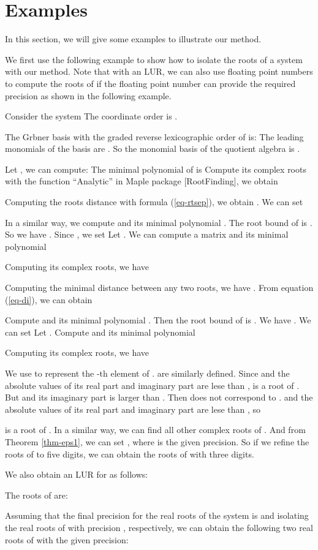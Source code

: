 \documentclass[amsthm]{JSC_LaTex_2007_Mar_12/elsart}
\def\bref#1{(\ref{#1})}
\begin{document}
\section{Examples}
In this section, we will give some examples to illustrate our
method.

We first use the following  example to show how to isolate the roots
of a system with our method. Note that with an LUR, we can also use
floating point numbers to compute the roots of  if the
floating point number can provide the required precision as shown in
the following example.

\begin{exmp} Consider the system
 The coordinate order is .

The Grbner basis  with the graded reverse
lexicographic order  of  is: {\small
} The leading monomials of the
basis are . So the monomial basis of the
quotient algebra  is .

Let , we can compute:
 The minimal polynomial of
 is  Compute its
complex roots with the function ``Analytic'' in Maple package
[RootFinding], we obtain

Computing the roots distance with formula \bref{eq-rtsep}, we obtain
. We can set 

In a similar way, we compute  and its minimal polynomial
. The root bound of  is
. So we have . Since , we
set  Let . We can compute a matrix
 and its minimal polynomial

Computing its complex roots, we have

Computing the minimal distance between any two roots, we have
. From equation \bref{eq-di}, we can obtain



Compute  and its minimal polynomial . Then the root bound of  is . We have
. We can set  Let . Compute
 and its minimal polynomial

Computing its complex roots, we have


We use  to represent the -th element of .  are similarly defined. Since
 and the
absolute values of its  real part and imaginary part are lese than
,  is a root of
. But  and its imaginary part is larger than . Then
 does not correspond to .
 and the
absolute values of its real part and imaginary part are lese than
, so

is a root of . In a similar way, we can find all other
complex roots of . And from Theorem \ref{thm-eps1}, we can
set , where  is the
given precision. So if we refine the roots of  to five
digits, we can obtain the roots of  with three digits.

We also obtain an LUR for  as follows:


The roots of  are: 

Assuming that the final precision for the real roots of the system
is  and isolating the real roots of 
with precision , respectively, we can
obtain the following two real roots of  with the given
precision: {\footnotesize

}
\end{exmp}
\end{document}

